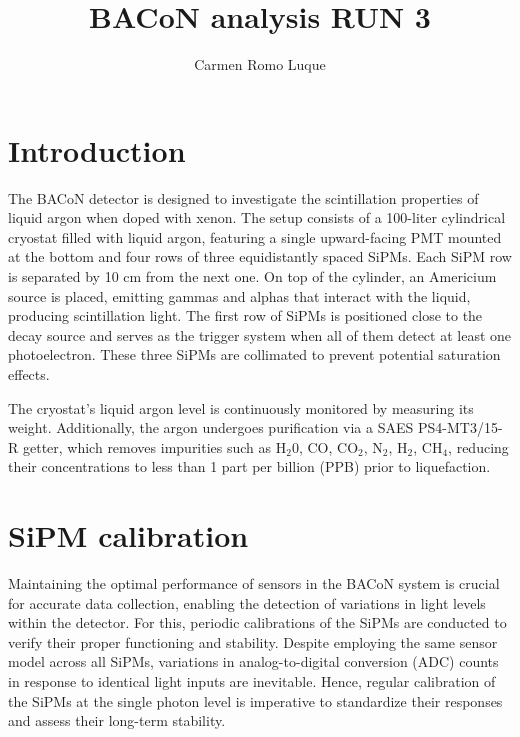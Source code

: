 \documentclass[11pt,a4paper,english,oneside, pdf]{article}
\title{BACoN analysis RUN 3}
\author{Carmen Romo Luque}
\begin{document}
	\maketitle
	
	\section{Introduction}	 
	 The BACoN detector is designed to investigate the scintillation properties of liquid argon when doped with xenon. The setup consists of a 100-liter cylindrical cryostat filled with liquid argon, featuring a single upward-facing PMT mounted at the bottom and four rows of three equidistantly spaced SiPMs. Each SiPM row is separated by 10 cm from the next one. On top of the cylinder, an Americium source is placed, emitting gammas and alphas that interact with the liquid, producing scintillation light. The first row of SiPMs is positioned close to the decay source and serves as the trigger system when all of them detect at least one photoelectron. These three SiPMs are collimated to prevent potential saturation effects.
	 
	 
	 The cryostat's liquid argon level is continuously monitored by measuring its weight. Additionally, the argon undergoes purification via a SAES PS4-MT3/15-R getter, which removes impurities such as H$_2$0, CO, CO$_2$, N$_2$, H$_2$, CH$_4$, reducing their concentrations to less than 1 part per billion (PPB) prior to liquefaction.
	 
	 
	 \clearpage
	
	\section{SiPM calibration}
	\label{cal_dark_box}
	
	Maintaining the optimal performance of sensors in the BACoN system is crucial for accurate data collection, enabling the detection of variations in light levels within the detector. For this, periodic calibrations of the SiPMs are conducted to verify their proper functioning and stability. Despite employing the same sensor model across all SiPMs, variations in analog-to-digital conversion (ADC) counts in response to identical light inputs are inevitable. Hence, regular calibration of the SiPMs at the single photon level is imperative to standardize their responses and assess their long-term stability.
	
\end{document}
